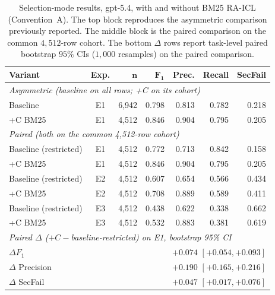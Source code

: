 \documentclass[10pt,a4paper,twocolumn]{article}
\begin{document}
\begin{table}[!t]
\centering
\caption{Selection-mode results, gpt-5.4, with and without BM25 RA-ICL (Convention~A). The top block reproduces the asymmetric comparison previously reported. The middle block is the paired comparison on the common $4{,}512$-row cohort. The bottom $\Delta$ rows report task-level paired bootstrap $95\%$ CIs ($1{,}000$ resamples) on the paired comparison.}
\label{tab:raicl_security}
\scriptsize
\setlength{\tabcolsep}{2.2pt}
\begin{tabular}{@{}lcrrrrr@{}}
\toprule
\textbf{Variant} & \textbf{Exp.} & $\mathbf{n}$ & $\mathbf{F_1}$ & \textbf{Prec.} & \textbf{Recall} & \textbf{SecFail} \\
\midrule
\multicolumn{7}{l}{\textit{Asymmetric (baseline on all rows; +C on its cohort)}} \\
Baseline       & E1 & 6{,}942 & 0.798 & 0.813 & 0.782 & 0.218 \\
+C BM25        & E1 & 4{,}512 & 0.846 & 0.904 & 0.795 & 0.205 \\
\midrule
\multicolumn{7}{l}{\textit{Paired (both on the common 4{,}512-row cohort)}} \\
Baseline (restricted) & E1 & 4{,}512 & 0.772 & 0.713 & 0.842 & 0.158 \\
+C BM25               & E1 & 4{,}512 & 0.846 & 0.904 & 0.795 & 0.205 \\
Baseline (restricted) & E2 & 4{,}512 & 0.607 & 0.654 & 0.566 & 0.434 \\
+C BM25               & E2 & 4{,}512 & 0.708 & 0.889 & 0.589 & 0.411 \\
Baseline (restricted) & E3 & 4{,}512 & 0.438 & 0.622 & 0.338 & 0.662 \\
+C BM25               & E3 & 4{,}512 & 0.532 & 0.883 & 0.381 & 0.619 \\
\midrule
\multicolumn{7}{l}{\textit{Paired $\Delta$ ($+C - $baseline-restricted) on E1, bootstrap 95\% CI}} \\
\multicolumn{3}{l}{$\Delta F_1$} & \multicolumn{4}{r}{$+0.074$ $[+0.054, +0.093]$} \\
\multicolumn{3}{l}{$\Delta$ Precision} & \multicolumn{4}{r}{$+0.190$ $[+0.165, +0.216]$} \\
\multicolumn{3}{l}{$\Delta$ SecFail} & \multicolumn{4}{r}{$\mathbf{+0.047}$ $[+0.017, +0.076]$} \\
\bottomrule
\end{tabular}
\end{table}
\end{document}
